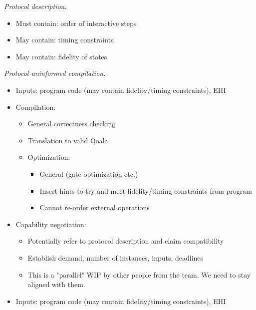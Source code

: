 \textit{Protocol description}.
\begin{itemize}
    \item Must contain: order of interactive steps
    \item May contain: timing constraints
    \item May contain: fidelity of states
\end{itemize}

\textit{Protocol-uninformed compilation}.
\begin{itemize}
\item Inputs: program code (may contain fidelity/timing constraints), EHI
\item Compilation:
    \begin{itemize}
        \item General correctness checking
        \item Translation to valid Qoala
        \item Optimization:
            \begin{itemize}
                \item General (gate optimization etc.)
                \item Insert hints to try and meet fidelity/timing constraints from program
                \item Cannot re-order external operations
        \end{itemize}
    \end{itemize}
\item Capability negotiation:
    \begin{itemize}
        \item Potentially refer to protocol description and claim compatibility
        \item Establish demand, number of instances, inputs, deadlines
        \item This is a "parallel" WIP by other people from the team. We need to stay aligned with them.
    \end{itemize}
\item Inputs: program code (may contain fidelity/timing constraints), EHI
\end{itemize}

